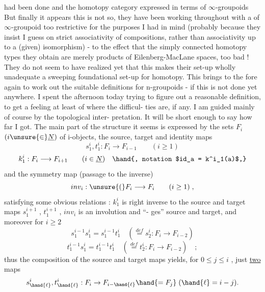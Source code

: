 
had been done and the homotopy category expressed in terms of $\infty$-groupoids
But finally it appears this is not so,  they have been working throughout
with a  of $\infty$-groupoid too restrictive for the purposes I had in
mind (probably because they insist I guess on strict associativity of
compositions,  rather than associativity up to a (given) isomorphism) -
to the effect that the simply connected homotopy types they obtain are
merely products of Eilenberg-MacLane spaces,  too bad !  They do not seem
to have realized yet that this makes their set-up wholly unadequate  
a sweeping foundational set-up for homotopy.  This brings to the fore
again to work out the suitable definitions for n-groupoids -  if this is
not done yet anywhere.  I spent the afternoon today trying to figure out
a reasonable definition,  to get a feeling at least of where the difficul-%
ties are, if any.  I am guided mainly of course by the topological inter-%
pretation.  It will be short enough to say how far I got.  The main part
of the structure it seems is expressed by the sets $F_i$ $(i\unsure{\in}\underline{N})$ of i-objects,
the source, target and identity maps
\[ s^i_1, t^i_1 : F_i \longrightarrow F_{i-1} \qquad (i \geq 1) \]
\[ k^i_1 : F_i \longrightarrow F_{i+1} \qquad (i \in \underline{N}) \quad \hand{, notation $id_a = k^i_1(a)$,} \]
and the symmetry map (passage to the inverse) 
\[ inv_i : \unsure{(}F_i \longrightarrow F_i \qquad (i \geq 1) \;, \]
satisfying some obvious relations :  $k^i_1$ is right inverse to the 
source and target maps $s^{i+1}_1$ , $t^{i+1}_1$ ,  $inv_i$  is an involution and ``-%
ges'' source and target,  and moreover for  $i \geq 2$
\[ s^{i-1}_1 s^i_1 = s^{i-1}_1 t^i_1 \quad (\overset{def}{=} s^i_2 : F_i \longrightarrow F_{i-2}) \]
\[ t^{i-1}_1 s^i_1 = t^{i-1}_1 t^i_1 \quad (\overset{def}{=} t^i_2 : F_i \longrightarrow F_{i-2}) \quad ; \]
thus the composition of the source and target maps yields,  for  $0 \leqslant j \leqslant i$ ,
just \uline{two} maps
\[ s^i_{\hand{\ell}} , t^i_{\hand{\ell}} : F_i \rightarrow F_{i-\hand{\ell}} \hand{= F_j} \; ( \hand{\ell} = i-j ) . \]
